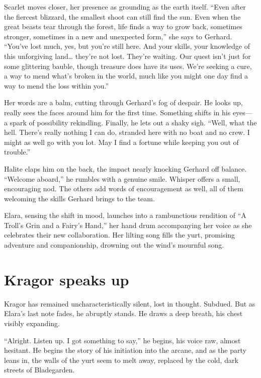 \documentclass[
  letterpaper,12pt,twoside,twocolumn,openany,
  nodeprecatedcode,bg=full]{dndbook}
\begin{document}
Scarlet moves closer, her presence as grounding as the earth itself.
``Even after the fiercest blizzard, the smallest shoot can still find
the sun. Even when the great beasts tear through the forest, life finds
a way to grow back, sometimes stronger, sometimes in a new and
unexpected form,'' she says to Gerhard. ``You've lost much, yes, but
you're still here. And your skills, your knowledge of this unforgiving
land\ldots{} they're not lost. They're waiting. Our quest isn't just for
some glittering bauble, though treasure does have its uses. We're
seeking a cure, a way to mend what's broken in the world, much like you
might one day find a way to mend the loss within you.''

Her words are a balm, cutting through Gerhard's fog of despair. He looks
up, really sees the faces around him for the first time. Something
shifts in his eyes--- a spark of possibility rekindling. Finally, he
lets out a shaky sigh. ``Well, what the hell. There's really nothing I
can do, stranded here with no boat and no crew. I might as well go with
you lot. May I find a fortune while keeping you out of trouble.''

Halite claps him on the back, the impact nearly knocking Gerhard off
balance. ``Welcome aboard,'' he rumbles with a genuine smile. Whisper
offers a small, encouraging nod. The others add words of encouragement
as well, all of them welcoming the skills Gerhard brings to the team.

Elara, sensing the shift in mood, launches into a rambunctious rendition
of ``A Troll's Grin and a Fairy's Hand,'' her hand drum accompanying her
voice as she celebrates their new collaboration. Her lilting song fills
the yurt, promising adventure and companionship, drowning out the wind's
mournful song.

\section{Kragor speaks up}\label{kragor-speaks-up}

Kragor has remained uncharacteristically silent, lost in thought.
Subdued. But as Elara's last note fades, he abruptly stands. He draws a
deep breath, his chest visibly expanding.

``Alright. Listen up. I got something to say,'' he begins, his voice
raw, almost hesitant. He begins the story of his initiation into the
arcane, and as the party leans in, the walls of the yurt seem to melt
away, replaced by the cold, dark streets of Bladegarden.
\end{document}
